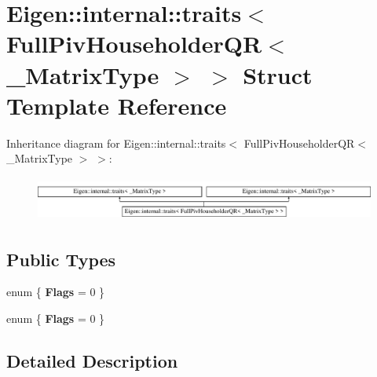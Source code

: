 \hypertarget{struct_eigen_1_1internal_1_1traits_3_01_full_piv_householder_q_r_3_01___matrix_type_01_4_01_4}{}\section{Eigen\+:\+:internal\+:\+:traits$<$ Full\+Piv\+Householder\+QR$<$ \+\_\+\+Matrix\+Type $>$ $>$ Struct Template Reference}
\label{struct_eigen_1_1internal_1_1traits_3_01_full_piv_householder_q_r_3_01___matrix_type_01_4_01_4}
Inheritance diagram for Eigen\+:\+:internal\+:\+:traits$<$ Full\+Piv\+Householder\+QR$<$ \+\_\+\+Matrix\+Type $>$ $>$\+:\begin{figure}[H]
\begin{center}
\leavevmode
\includegraphics[height=1.473684cm]{struct_eigen_1_1internal_1_1traits_3_01_full_piv_householder_q_r_3_01___matrix_type_01_4_01_4}
\end{center}
\end{figure}
\subsection*{Public Types}
\begin{DoxyCompactItemize}
\item 
\mbox{\label{struct_eigen_1_1internal_1_1traits_3_01_full_piv_householder_q_r_3_01___matrix_type_01_4_01_4_a9bdb6011063b2eb2ace82ff578be9bb7}} 
enum \{ {\bfseries Flags} = 0
 \}
\item 
\mbox{\label{struct_eigen_1_1internal_1_1traits_3_01_full_piv_householder_q_r_3_01___matrix_type_01_4_01_4_afeb707f1b8d365356f551804fd366f5f}} 
enum \{ {\bfseries Flags} = 0
 \}
\end{DoxyCompactItemize}


\subsection{Detailed Description}
